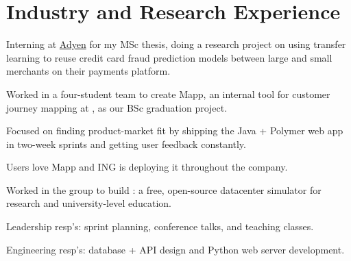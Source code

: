 \documentclass[]{deedy-resume-openfont}
\begin{document}
\hfill
\begin{minipage}[t]{0.66\textwidth} 


\section{Industry and Research Experience}

\vspace{\topsep}
\begin{tightemize}
    \item Interning at \href{https://adyen.com}{Adyen} for my MSc thesis, doing a research project on using transfer learning to reuse credit card fraud prediction models between large and small merchants on their payments platform.
\end{tightemize}
\vspace{0.5\topsep}

\begin{tightemize}
    \item Worked in a four-student team to create Mapp, an internal tool for customer journey mapping at \href{https://www.ing.com/}{}, as our BSc graduation project.
    \item Focused on finding product-market fit by shipping the Java + Polymer web app in two-week sprints and getting user feedback constantly.
    \item Users love Mapp and ING is deploying it throughout the company.
\end{tightemize}
\vspace{0.5\topsep}

\begin{tightemize}
    \item Worked in the \href{https://atlarge-research.com/}{} group to build \href{https://opendc.org}{}: a free, open-source datacenter simulator for research and university-level education.
    \item Leadership resp's: sprint planning, conference talks, and teaching classes.
    \item Engineering resp's: database + API design and Python web server development.
\end{tightemize}
\vspace{0.5\topsep}


\end{minipage}
\end{document}
